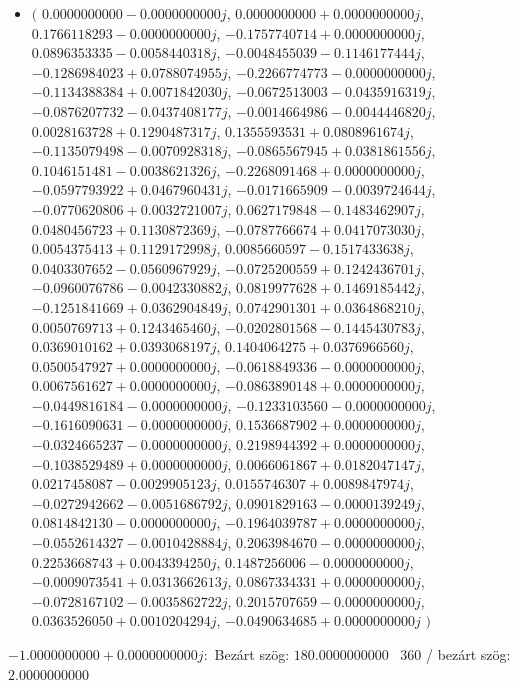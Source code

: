 \documentclass[14pt,a4paper]{article}
\begin{document}
\begin{itemize}
\item
$\big($
$0.0000000000-0.0000000000j$, $0.0000000000+0.0000000000j$, $0.1766118293-0.0000000000j$, $-0.1757740714+0.0000000000j$, $0.0896353335-0.0058440318j$, $-0.0048455039-0.1146177444j$, $-0.1286984023+0.0788074955j$, $-0.2266774773-0.0000000000j$, $-0.1134388384+0.0071842030j$, $-0.0672513003-0.0435916319j$, $-0.0876207732-0.0437408177j$, $-0.0014664986-0.0044446820j$, $0.0028163728+0.1290487317j$, $0.1355593531+0.0808961674j$, $-0.1135079498-0.0070928318j$, $-0.0865567945+0.0381861556j$, $0.1046151481-0.0038621326j$, $-0.2268091468+0.0000000000j$, $-0.0597793922+0.0467960431j$, $-0.0171665909-0.0039724644j$, $-0.0770620806+0.0032721007j$, $0.0627179848-0.1483462907j$, $0.0480456723+0.1130872369j$, $-0.0787766674+0.0417073030j$, $0.0054375413+0.1129172998j$, $0.0085660597-0.1517433638j$, $0.0403307652-0.0560967929j$, $-0.0725200559+0.1242436701j$, $-0.0960076786-0.0042330882j$, $0.0819977628+0.1469185442j$, $-0.1251841669+0.0362904849j$, $0.0742901301+0.0364868210j$, $0.0050769713+0.1243465460j$, $-0.0202801568-0.1445430783j$, $0.0369010162+0.0393068197j$, $0.1404064275+0.0376966560j$, $0.0500547927+0.0000000000j$, $-0.0618849336-0.0000000000j$, $0.0067561627+0.0000000000j$, $-0.0863890148+0.0000000000j$, $-0.0449816184-0.0000000000j$, $-0.1233103560-0.0000000000j$, $-0.1616090631-0.0000000000j$, $0.1536687902+0.0000000000j$, $-0.0324665237-0.0000000000j$, $0.2198944392+0.0000000000j$, $-0.1038529489+0.0000000000j$, $0.0066061867+0.0182047147j$, $0.0217458087-0.0029905123j$, $0.0155746307+0.0089847974j$, $-0.0272942662-0.0051686792j$, $0.0901829163-0.0000139249j$, $0.0814842130-0.0000000000j$, $-0.1964039787+0.0000000000j$, $-0.0552614327-0.0010428884j$, $0.2063984670-0.0000000000j$, $0.2253668743+0.0043394250j$, $0.1487256006-0.0000000000j$, $-0.0009073541+0.0313662613j$, $0.0867334331+0.0000000000j$, $-0.0728167102-0.0035862722j$, $0.2015707659-0.0000000000j$, $0.0363526050+0.0010204294j$, $-0.0490634685+0.0000000000j$
$\big)$
\end{itemize}
$-1.0000000000+0.0000000000j$:\
Bezárt szög: $180.0000000000$ \
360 / bezárt szög: $2.0000000000$\
\end{document}
